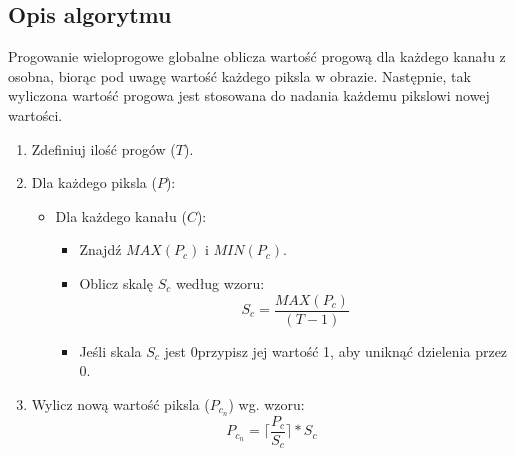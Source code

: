 \documentclass[a4paper,12pt, titlepage]{report}
\begin{document}
\subsection*{Opis algorytmu}
\par Progowanie wieloprogowe globalne oblicza wartość progową dla każdego kanału z osobna, biorąc pod uwagę wartość każdego piksla w obrazie. Następnie, tak wyliczona wartość progowa jest stosowana do nadania każdemu pikslowi nowej wartości.
\begin{enumerate}
\item Zdefiniuj ilość progów (\(T\)).
\item Dla każdego piksla (\(P\)):
\begin{itemize}
\item Dla każdego kanału (\(C\)):
\begin{itemize}
\item Znajdź \(MAX(P_{c})\) i \(MIN(P_{c})\).
\item Oblicz skalę \(S_{c}\) według wzoru: \[S_{c}=\frac{MAX(P_{c})}{(T-1)}\]
\item Jeśli skala \(S_{c}\) jest 0przypisz jej wartość 1, aby uniknąć dzielenia przez 0.
\end{itemize}
\end{itemize}
\item Wylicz nową wartość piksla (\(P_{c_{n}}\)) wg. wzoru: \[P_{c_{n}}=\Big\lceil\frac{P_{c}}{S_{c}}\Big\rceil*S_{c}\]
\end{enumerate}
\end{document}
